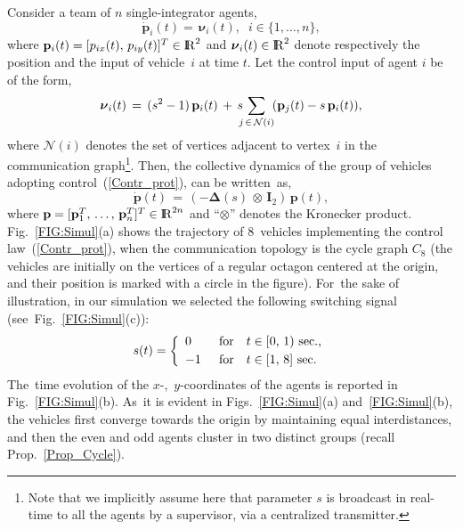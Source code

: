 \documentclass[letterpaper,9pt,twocolumn]{autart}
\newcommand{\rr}{\mathop{{\rm I}\mskip-4.0mu{\rm R}}\nolimits}
\newcommand{\vet}[1]{\ensuremath{{\mathbf #1}}}
\begin{document}
Consider a team of $n$ single-integrator agents,
$$
\dot{\vet{p}}_i(t) =\, \boldsymbol{\nu}_i(t),\;\; i \in \{1,\ldots,n\},
$$
where $\vet{p}_i(t) = [p_{ix}(t),\,p_{iy}(t)]^T \in \rr^2$ and
$\boldsymbol{\nu}_i(t) \in \rr^2$ denote respectively the position and
the input of vehicle~$i$ at time $t$. Let the control input
of agent $i$ be of the form,
\begin{equation}\label{Contr_prot}
\boldsymbol{\nu}_i(t) \,=\, (s^2 - 1)\,\vet{p}_i(t) \,+\,
s\!\!\!\sum_{j \,\in\, \mathcal{N}(i)} \!(\vet{p}_j(t) - s\,\vet{p}_i(t)),\vspace{-0.1cm}
\end{equation}
where $\mathcal{N}(i)$ denotes the set of vertices adjacent to vertex~$i$ in the communication graph\footnote{Note that we implicitly assume here that parameter $s$
is broadcast in real-time to all the agents by a supervisor, via a centralized transmitter.}. Then, the collective dynamics of the group of vehicles adopting control~(\ref{Contr_prot}),
can be written~as, $$
\dot{\vet{p}}(t) \,=\, (-\boldsymbol{\Delta}(s) \,\otimes\, \vet{I}_2)\,\vet{p}(t),
$$
where $\vet{p} = [\vet{p}_1^T,\,\ldots,\,\vet{p}_n^T]^T \in \rr^{2n}$
and ``$\otimes$'' denotes the Kronecker product.\\
Fig.~\ref{FIG:Simul}(a) shows the trajectory of 8~vehicles
implementing the control law~(\ref{Contr_prot}), when the communication topology is the cycle graph $C_8$
(the vehicles are initially on the vertices of a regular octagon
centered at the origin, and their position is marked with a circle in the figure).
For~the sake of illustration, in our simulation 
we selected the following switching signal
(see~Fig.~\ref{FIG:Simul}(c)): \vspace{-0.1cm}
$$
s(t) = \left\{
\begin{array}{lcl}
0\; &\,\text{for} & t \in [0,\, 1)~\text{sec}.,\vspace{0.09cm}\\
-1\; &\,\text{for} & t \in [1,\,8]~\text{sec}.
\end{array}
\right.
$$
The~time evolution of the \mbox{$x$-, $y$}-coordinates of the
agents is reported in Fig.~\ref{FIG:Simul}(b). As~it is evident
in Figs.~\ref{FIG:Simul}(a) and~\ref{FIG:Simul}(b), the vehicles first
converge towards the origin by maintaining equal interdistances, 
and then the even and odd agents cluster in two distinct groups (recall Prop.~\ref{Prop_Cycle}).
\end{document}
